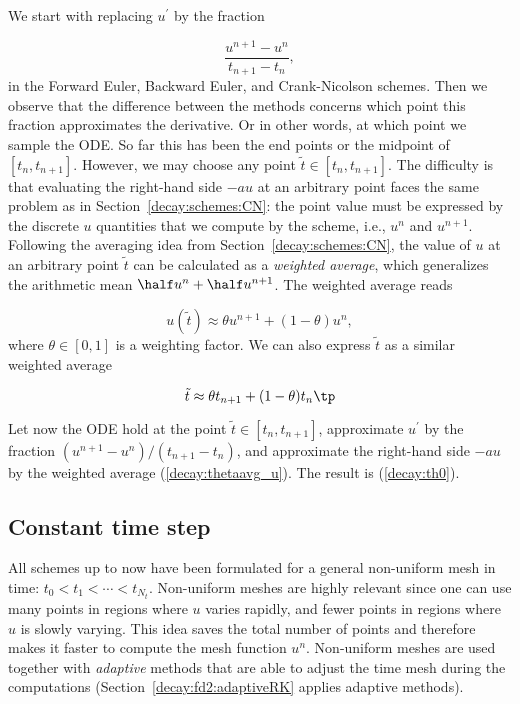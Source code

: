 \documentclass[graybox,sectrefs,envcountresetchap,open=right,final]{svmonodo}
\newenvironment{notice_mdfboxadmon}[1][]{
\begin{notice_mdfboxmdframed}[frametitle=#1]
}
{
\end{notice_mdfboxmdframed}
}
\begin{document}
\begin{notice_mdfboxadmon}[Derivation.]
We start with replacing $u^{\prime}$ by the fraction

\begin{equation*} \frac{u^{n+1}-u^{n}}{t_{n+1}-t_n},\end{equation*}
in the Forward Euler, Backward Euler,
and Crank-Nicolson schemes. Then we observe that
the difference between the methods concerns which point this
fraction approximates the derivative. Or in other words, at which point we
sample the ODE. So far this has been the
end points or the midpoint of $[t_n,t_{n+1}]$. However, we may choose any point
$\tilde t \in [t_n,t_{n+1}]$.
The difficulty
is that evaluating the right-hand side $-au$ at an arbitrary point
faces the same problem as in
Section~\ref{decay:schemes:CN}: the point value must be expressed
by the discrete $u$ quantities that we compute by the scheme, i.e.,
$u^n$ and $u^{n+1}$. Following the averaging idea from
Section~\ref{decay:schemes:CN},
the value of $u$ at an arbitrary point $\tilde t$ can be
calculated as a \emph{weighted average}, which generalizes the arithmetic mean
$\half u^n + {\half}u^{n+1}$.
The weighted average reads

\begin{equation}
u(\tilde t) \approx \theta u^{n+1} + (1-\theta) u^{n},
\label{decay:thetaavg_u}
\end{equation}
where $\theta\in [0,1]$ is a weighting factor.
We can also express $\tilde t$ as a similar weighted average

\begin{equation}
\tilde t \approx \theta t_{n+1} + (1-\theta) t_{n}\tp
\label{decay:thetaavg_t}
\end{equation}

Let now the ODE hold at the point
$\tilde t\in [t_n,t_{n+1}]$, approximate $u^{\prime}$ by the fraction
$(u^{n+1}-u^{n})/(t_{n+1}-t_n)$, and approximate the right-hand
side $-au$ by the weighted average (\ref{decay:thetaavg_u}).
The result is (\ref{decay:th0}).
\end{notice_mdfboxadmon} %



\subsection{Constant time step}

All schemes up to now have been formulated for a general non-uniform
mesh in time: $t_0 < t_1 < \cdots < t_{N_t}$.
Non-uniform meshes are highly relevant
since one can use many points in regions where $u$ varies rapidly, and
fewer points in regions where $u$ is slowly varying. This idea saves
the total number of points and therefore makes it faster to compute the mesh
function $u^n$. Non-uniform meshes are used together with
\emph{adaptive} methods that are able to adjust the time mesh during the
computations (Section~\ref{decay:fd2:adaptiveRK} applies adaptive methods).
\end{document}

